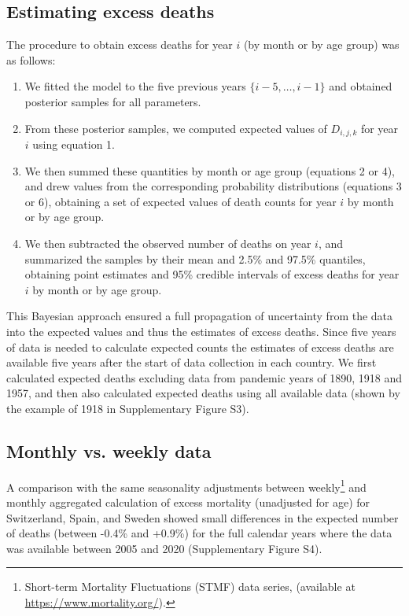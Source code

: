 \documentclass{article}
\begin{document}
	\subsection{Estimating excess deaths}
	
	The procedure to obtain excess deaths for year $i$ (by month or by age group) was as follows:
	\begin{enumerate}
		\item We fitted the model to the five previous years $\{i-5,\ldots,i-1\}$ and obtained posterior samples for all parameters.
		\item From these posterior samples, we computed expected values of $D_{i,j,k}$ for year $i$ using equation 1.
		\item We then summed these quantities by month or age group (equations 2 or 4), and drew values from the corresponding probability distributions (equations 3 or 6), obtaining a set of expected values of death counts for year $i$ by month or by age group. 
		\item We then subtracted the observed number of deaths on year $i$, and summarized the samples by their mean and 2.5\% and 97.5\% quantiles, obtaining point estimates and 95\% credible intervals of excess deaths for year $i$ by month or by age group. 
	\end{enumerate} 
	This Bayesian approach ensured a full propagation of uncertainty from the data into the expected values and thus the estimates of excess deaths.
	Since five years of data is needed to calculate expected counts the estimates of excess deaths are available five years after the start of data collection in each country. We first calculated expected deaths excluding data from pandemic years of 1890, 1918 and 1957, and then also calculated expected deaths using all available data (shown by the example of 1918 in Supplementary Figure S3).

	\subsection{Monthly vs. weekly data}
	
	A comparison with the same seasonality adjustments between weekly\footnote{Short-term Mortality Fluctuations (STMF) data series, (available at \url{https://www.mortality.org/}).} and monthly aggregated calculation of excess mortality (unadjusted for age) for Switzerland, Spain, and Sweden showed small differences in the expected number of deaths (between -0.4\% and +0.9\%) for the full calendar years where the data was available between 2005 and 2020 (Supplementary Figure S4).	
	
\end{document}
